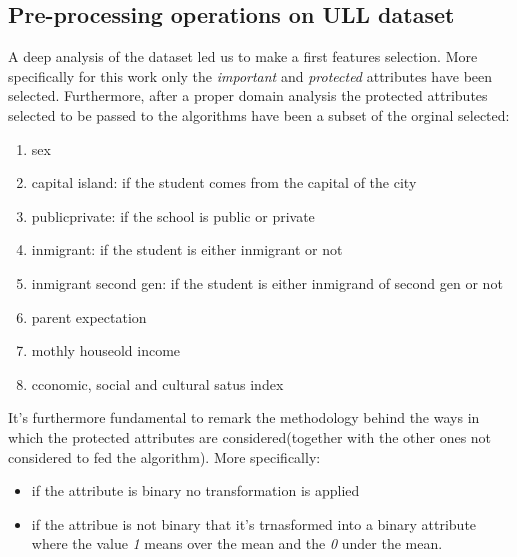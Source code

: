 \documentclass[12pt,a4paper,openright,twoside]{book}
\begin{document}
\subsection{Pre-processing operations on ULL dataset}
A deep analysis of the dataset led us to make a first features selection. More specifically for this work only the \emph{important} and \emph{protected} attributes have been selected.
Furthermore, after a proper domain analysis the protected attributes selected to be passed to the algorithms have been a subset of the orginal selected:
\begin{enumerate}
    \item sex
    \item capital island: if the student comes from the capital of the city
    \item public\textunderscore private: if the school is public or private
    \item inmigrant: if the student is either inmigrant or not
    \item inmigrant second gen: if the student is either inmigrand of second gen or not
    \item parent expectation
    \item mothly houseold income
    \item cconomic, social and cultural satus index
\end{enumerate}
It's furthermore fundamental to remark the methodology behind the ways in which the protected attributes are considered(together with the other ones not considered to fed the algorithm).
More specifically:
\begin{itemize}
    \item if the attribute is binary no transformation is applied
    \item if the attribue is not binary that it's trnasformed into a binary attribute where the value \emph{1} means over the mean and the \emph{0} under the mean.
\end{itemize}
\end{document}
